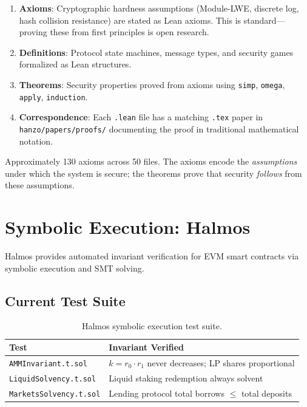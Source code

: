 \documentclass[11pt,letterpaper]{article}
\begin{document}
\begin{enumerate}
\item \textbf{Axioms}: Cryptographic hardness assumptions (Module-LWE, discrete log, hash collision resistance) are stated as Lean axioms. This is standard---proving these from first principles is open research.
\item \textbf{Definitions}: Protocol state machines, message types, and security games formalized as Lean structures.
\item \textbf{Theorems}: Security properties proved from axioms using \texttt{simp}, \texttt{omega}, \texttt{apply}, \texttt{induction}.
\item \textbf{Correspondence}: Each \texttt{.lean} file has a matching \texttt{.tex} paper in \texttt{hanzo/papers/proofs/} documenting the proof in traditional mathematical notation.
\end{enumerate}

Approximately 130 axioms across 50 files. The axioms encode the \emph{assumptions} under which the system is secure; the theorems prove that security \emph{follows} from these assumptions.

\section{Symbolic Execution: Halmos}

Halmos provides automated invariant verification for EVM smart contracts via symbolic execution and SMT solving.

\subsection{Current Test Suite}

\begin{table}[H]
\centering
\begin{tabular}{@{}lp{6.5cm}@{}}
\toprule
\textbf{Test} & \textbf{Invariant Verified} \\
\midrule
\texttt{AMMInvariant.t.sol} & $k = r_0 \cdot r_1$ never decreases; LP shares proportional \\
\texttt{LiquidSolvency.t.sol} & Liquid staking redemption always solvent \\
\texttt{MarketsSolvency.t.sol} & Lending protocol total borrows $\leq$ total deposits \\
\bottomrule
\end{tabular}
\caption{Halmos symbolic execution test suite.}
\label{tab:halmos}
\end{table}
\end{document}
